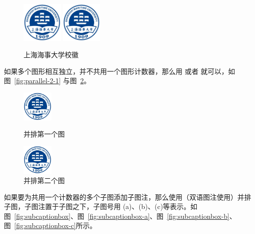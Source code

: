 \begin{figure}[!htp]
  \centering
  \includegraphics[height=2cm]{images/shmtu-badge}
  \hspace{1cm}
  \includegraphics[height=2cm]{images/shmtu-badge}
  \caption{上海海事大学校徽}
  \label{fig:parallel-1}
\end{figure}

如果多个图形相互独立，并不共用一个图形计数器，那么用  或者 就可以，如图~\ref{fig:parallel-2-1} 与图~\ref{fig:parallel-2-2}。

\begin{figure}[!htp]
  \begin{minipage}{0.48\textwidth}
  	\centering
    \includegraphics[height=1.5cm]{images/shmtu-badge.jpg}
    \caption{并排第一个图}
    \label{fig:parallel-2-1}
  \end{minipage}
  \hfill
  \begin{minipage}{0.48\textwidth}
    \centering
    \includegraphics[height=1.5cm]{images/shmtu-badge.jpg}
    \caption{并排第二个图}
    \label{fig:parallel-2-2}
  \end{minipage}
\end{figure}

如果要为共用一个计数器的多个子图添加子图注，那么使用（双语图注使用）并排子图，子图注置于子图之下，子图号用 (a)、(b)、(c)等表示。如图~\ref{fig:subcaptionbox}、图~\ref{fig:subcaptionbox-a}、图~\ref{fig:subcaptionbox-b}、图~\ref{fig:subcaptionbox-c}所示。

